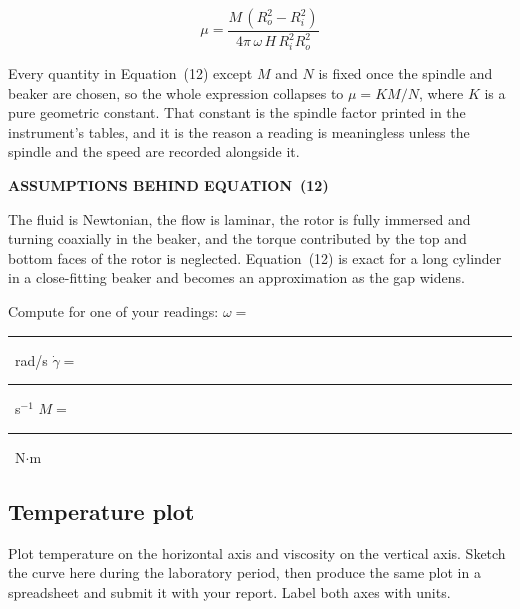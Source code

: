 \documentclass[11pt,a4paper]{article}
\newcommand{\bl}{\rule[-0.35em]{1.6cm}{0.4pt}}
\newcommand{\noteh}[1]{{\footnotesize\bfseries\sffamily\color{ink3}\MakeUppercase{#1}}\par\vspace{2pt}}
\begin{document}
\begin{equation}
  \mu = \frac{M\,(R_o^{2}-R_i^{2})}{4\pi\,\omega\,H\,R_i^{2}R_o^{2}}
\end{equation}

\smallskip
Every quantity in Equation~(12) except $M$ and $N$ is fixed once the spindle and beaker are
chosen, so the whole expression collapses to $\mu = KM/N$, where $K$ is a pure geometric
constant. That constant is the spindle factor printed in the instrument's tables, and it is the
reason a reading is meaningless unless the spindle and the speed are recorded alongside it.

\begin{labnote}
\noteh{Assumptions behind Equation~(12)}
The fluid is Newtonian, the flow is laminar, the rotor is fully immersed and turning coaxially
in the beaker, and the torque contributed by the top and bottom faces of the rotor is neglected.
Equation~(12) is exact for a long cylinder in a close-fitting beaker and becomes an
approximation as the gap widens.
\end{labnote}

\smallskip
\noindent Compute for one of your readings: \quad
$\omega =$ \bl\ rad/s \quad $\dot\gamma =$ \bl\ s$^{-1}$ \quad $M =$ \bl\ N$\cdot$m \par

\subsection{Temperature plot}
Plot temperature on the horizontal axis and viscosity on the vertical axis. Sketch the curve
here during the laboratory period, then produce the same plot in a spreadsheet and submit it
with your report. Label both axes with units.
\end{document}
